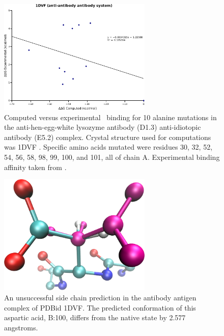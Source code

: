\begin{figure}[h]
    \centering
    \includegraphics[width=0.65\textwidth]{figures/1dvf.png}
    \caption{Computed versus experimental \ddg\ binding for 10 alanine mutations in the anti-hen-egg-white lysozyme antibody (D1.3) anti-idiotopic antibody (E5.2) complex.
    Crystal structure used for computations was 1DVF \protect\cite{braden1996crystal}.
    Specific amino acids mutated were residues 30, 32, 52, 54, 56, 58, 98, 99, 100, and 101, all of chain A.
    Experimental binding affinity taken from \protect\cite{thorn2001asedb}.}
    \label{figure:computational_mutation_scanning/1DVF_ddg}
\end{figure}




\begin{figure}[h]
    \centering
    \includegraphics[width=0.65\textwidth,height=0.3\textheight,keepaspectratio]{figures/mutation_side_chain_images/1dvf_chain_b_100.png}
    \caption{An unsuccessful side chain prediction in the antibody antigen complex of PDBid 1DVF.  
    The predicted conformation of this aspartic acid, B:100, differs from the native state by 2.577 angstroms.}
    \label{figure:computational_mutation_scanning/1DVF_b_100}
\end{figure}

